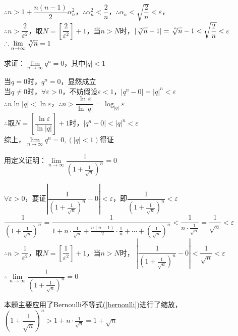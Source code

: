 \documentclass[11pt,fleqn]{book} %
\begin{document}
\begin{enumerate}
\begin{prove}
$\therefore n > 1 + \dfrac{n(n-1)}{2}\alpha_n^2$，$\therefore \alpha_n^2<\dfrac{2}{n}$，$\therefore \alpha_n< \sqrt{\dfrac{2}{n}}<\varepsilon$，\\
$\therefore n > \dfrac{2}{\varepsilon^2}$，取$N=\left[\dfrac{2}{\varepsilon^2}\right]+1$，当$n>N$时，$\left|\sqrt[\leftroot{-2}\uproot{4}n]{n}-1\right|=\sqrt[\leftroot{-2}\uproot{4}n]{n}-1<\sqrt{\dfrac{2}{n}}<\varepsilon$\\
$\therefore \lim\limits_{n\rightarrow \infty} \sqrt[\leftroot{-2}\uproot{4}n]{n}=1$
\end{prove}
\begin{example}
  求证：$\lim\limits_{n\rightarrow \infty} q^n=0$，其中$|q|<1$
\end{example}
\begin{prove}
当$q=0$时，$q^n=0$，显然成立\\
当$q\neq 0$时，$\forall \varepsilon>0$，不妨假设$\varepsilon<1$，$|q^n-0|=|q|^n<\varepsilon$\\
$\therefore n \ln |q|< \ln \varepsilon$，$\therefore n > \dfrac{\ln \varepsilon}{\ln |q|} = \log_{|q|}\varepsilon$\\
$\therefore$取$N = \left[\dfrac{\ln \varepsilon}{\ln |q|} \right]+1$时，$|q^n-0|<|q|^n<\varepsilon$\\
综上，$\lim\limits_{n\rightarrow \infty} q^n=0,(|q|<1)$得证
\end{prove}
\begin{example}
  用定义证明：$\lim\limits_{n\rightarrow \infty} \dfrac{1}{\left(1+\frac{1}{\sqrt{n}}\right)^n}=0$
\end{example}
\begin{prove}
$\forall \varepsilon>0$，要证$\left|\dfrac{1}{\left(1+\frac{1}{\sqrt{n}}\right)^n}-0\right|<\varepsilon$，即$\dfrac{1}{\left(1+\frac{1}{\sqrt{n}}\right)^n}<\varepsilon$\\
$\dfrac{1}{\left(1+\frac{1}{\sqrt{n}}\right)^n}=\dfrac{1}{1+n\cdot \frac{1}{\sqrt{n}}+\frac{n(n-1)}{2}\cdot\frac{1}{n}+\cdots + \left(\frac{1}{\sqrt{n}}\right)^n}<\dfrac{1}{n\cdot \frac{1}{\sqrt{n}}}=\dfrac{1}{\sqrt{n}}<\varepsilon$\\
$\therefore n > \dfrac{1}{\varepsilon^2}$，取$N = \left[\dfrac{1}{\varepsilon^2}\right]+1$，当$n>N$时，
$\left|\dfrac{1}{\left(1+\frac{1}{\sqrt{n}}\right)^n}-0\right|<\dfrac{1}{\sqrt{n}}<\varepsilon$\\
$\therefore \lim\limits_{n\rightarrow \infty} \dfrac{1}{\left(1+\frac{1}{\sqrt{n}}\right)^n}=0$
\end{prove}
本题主要应用了Bernoulli不等式(\ref{bernoulli})进行了缩放，$\left(1+\dfrac{1}{\sqrt{n}}\right)^n>1+n\cdot\frac{1}{\sqrt{n}}=1+\sqrt{n}$

\end{enumerate}
\end{document}
